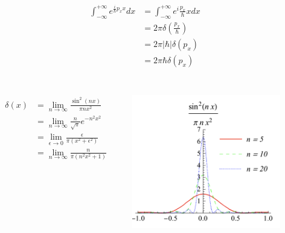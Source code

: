 \begin{frame}
	\frametitle{}
	\证 ~  \[
		\begin{aligned}
			\int_{-\infty}^{+\infty} e^{\frac{i}{\hbar} p_x x} d x &= \int_{-\infty}^{+\infty} e^i{\frac{p_x}{\hbar} x} d x  \\
			&= 2\pi \delta(\frac{p_x}{\hbar}) \\
			&= 2\pi \left|\hbar\right| \delta(p_x) \\
			&= 2\pi \hbar \delta(p_x) \\
		\end{aligned}
		   \]
\end{frame}

\begin{frame}
	\frametitle{}
		\begin{columns}
			\begin{column}[t]{0.46\linewidth}
	\[\begin{aligned}
			\delta(x) &= \lim_{n \to \infty} \frac{\sin^2(nx)}{\pi n x^2 }  \\
			&= \lim_{n \to \infty} \frac{n}{\sqrt{\pi} } e^{-n^2x^2} \\
			&= \lim_{\epsilon \to 0} \frac{\epsilon}{\pi(x^2+\epsilon^2)}  \\
			&= \lim_{n \to \infty} \frac{n}{\pi(n^2x^2+1)}  
	\end{aligned}\]			
			\end{column}
			\begin{column}[t]{0.46\linewidth}
				  \begin{center}
					   \includegraphics[width=0.9\textwidth,height=2.3in]{figs/5-1.png}
				  \end{center}
			\end{column}
		\end{columns}
\end{frame}

